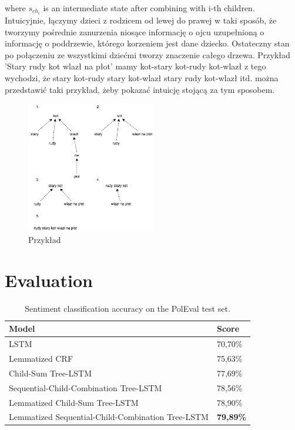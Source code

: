 \documentclass[10pt, a4paper]{article}
\begin{document}
	where $s_{ch_i}$ is an intermediate state after combining with i-th children.\\
Intuicyjnie, łączymy dzieci z rodzicem od lewej do prawej w taki sposób, że tworzymy pośrednie zanurzenia niosące informację o ojcu uzupełnioną o informację o poddrzewie, którego korzeniem jest dane dziecko.
Ostateczny stan po połączeniu ze wszystkimi dziećmi tworzy znaczenie całego drzewa.
Przykład 'Stary rudy kot wlazł na płot'
mamy kot-stary kot-rudy kot-wlazł
z tego wychodzi, że stary kot-rudy stary kot-wlazł
stary rudy kot-wlazł itd.
można przedstawić taki przykład, żeby pokazać intuicję stojącą za tym sposobem.
\begin{figure}[h]
	\begin{center}
		\includegraphics[width=0.5\textwidth]{staryrudykot}
		\caption{Przykład}
	\end{center}
\end{figure}
	
\section{Evaluation} 

\begin{table}[h]
 \begin{center}
\begin{tabular}{|l|l|}

      \hline
      Model & Score\\
      \hline
      LSTM &70,70\%\\
      \hline
      Lemmatized CRF & 75,63\%\\
      \hline
      Child-Sum Tree-LSTM &  77,69\%\\
      \hline
      Sequential-Child-Combination Tree-LSTM & 78,56\%\\
      \hline
      Lemmatized Child-Sum Tree-LSTM & 78,90\%\\
      \hline
      Lemmatized Sequential-Child-Combination Tree-LSTM & \textbf{79,89\%} \\
      \hline
\end{tabular}
\caption{Sentiment classification accuracy on the PolEval test set.}
\label{tab:evaluation}
 \end{center}
\end{table}
\end{document}

